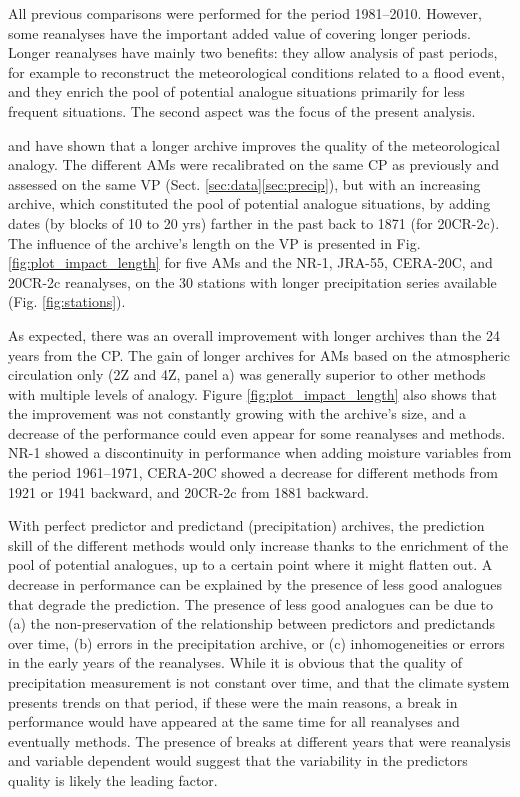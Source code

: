 \documentclass{ametsoc}
\begin{document}
All previous comparisons were performed for the period 1981--2010. However, some reanalyses have the important added value of covering longer periods. Longer reanalyses have mainly two benefits: they allow analysis of past periods, for example to reconstruct the meteorological conditions related to a flood event, and they enrich the pool of potential analogue situations primarily for less frequent situations. The second aspect was the focus of the present analysis. 

\citet{Ruosteenoja1988} and \citet{Vandendool1994} have shown that a longer archive improves the quality of the meteorological analogy. The different AMs were recalibrated on the same CP as previously and assessed on the same VP (Sect. \ref{sec:data}\ref{sec:precip}), but with an increasing archive, which constituted the pool of potential analogue situations, by adding dates (by blocks of 10 to 20 yrs) farther in the past back to 1871 (for 20CR-2c). The influence of the archive's length on the VP is presented in Fig. \ref{fig:plot_impact_length} for five AMs and the NR-1, JRA-55, CERA-20C, and 20CR-2c reanalyses, on the 30 stations with longer precipitation series available (Fig. \ref{fig:stations}). 

As expected, there was an overall improvement with longer archives than the 24 years from the CP. The gain of longer archives for AMs based on the atmospheric circulation only (2Z and 4Z, panel a) was generally superior to other methods with multiple levels of analogy. Figure \ref{fig:plot_impact_length} also shows that the improvement was not constantly growing with the archive's size, and a decrease of the performance could even appear for some reanalyses and methods. NR-1 showed a discontinuity in performance when adding moisture variables from the period 1961--1971, CERA-20C showed a decrease for different methods from 1921 or 1941 backward, and 20CR-2c from 1881 backward.

With perfect predictor and predictand (precipitation) archives, the prediction skill of the different methods would only increase thanks to the enrichment of the pool of potential analogues, up to a certain point where it might flatten out. A decrease in performance can be explained by the presence of less good analogues that degrade the prediction. The presence of less good analogues can be due to (a) the non-preservation of the relationship between predictors and predictands over time, (b) errors in the precipitation archive, or (c) inhomogeneities or errors in the early years of the reanalyses. While it is obvious that the quality of precipitation measurement is not constant over time, and that the climate system presents trends on that period, if these were the main reasons, a break in performance would have appeared at the same time for all reanalyses and eventually methods. The presence of breaks at different years that were reanalysis and variable dependent would suggest that the variability in the predictors quality is likely the leading factor.
\end{document}

